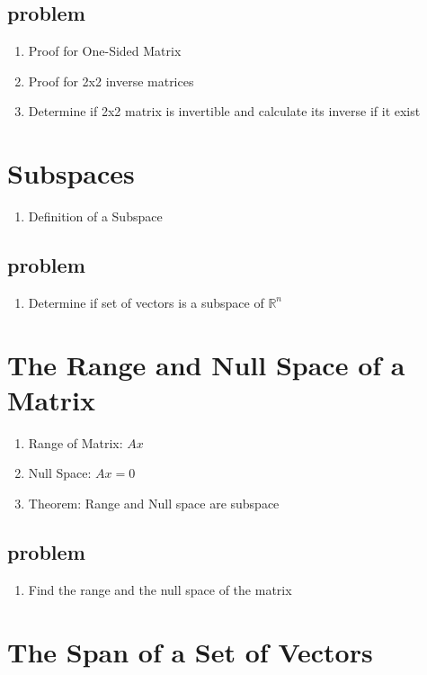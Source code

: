 \documentclass{article}
\begin{document}
\subsection{problem}
\begin{enumerate}
    \item Proof for One-Sided Matrix
    \item Proof for 2x2 inverse matrices
    \item Determine if 2x2 matrix is invertible and calculate its inverse
	if it exist
\end{enumerate}

\section{Subspaces}

\begin{enumerate}
    \item Definition of a Subspace
\end{enumerate}

\subsection{problem}
\begin{enumerate}
    \item Determine if set of vectors is a subspace of $\mathbb{R}^n$
\end{enumerate}

\section{The Range and Null Space of a Matrix}

\begin{enumerate}
    \item Range of Matrix: $Ax$
    \item Null Space: $Ax=0$
    \item Theorem: Range and Null space are subspace
\end{enumerate}

\subsection{problem}
\begin{enumerate}
    \item Find the range and the null space of the matrix
\end{enumerate}

\section{The Span of a Set of Vectors}
\end{document}
